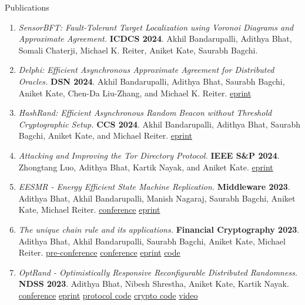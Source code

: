 \documentclass{resume}
\begin{document}
\begin{rSection}{Publications}
\label{sec:org0ffd259}
\vspace{0.5em}
\begin{enumerate}
\item \label{orgc2aa619} \emph{SensorBFT: Fault-Tolerant Target Localization using Voronoi Diagrams and Approximate Agreement.} \textbf{ICDCS 2024}. Akhil Bandarupalli, Adithya Bhat, Somali Chaterji, Michael K. Reiter, Aniket Kate, Saurabh Bagchi.
\item \label{orge4db138} \emph{Delphi: Efficient Asynchronous Approximate Agreement for Distributed Oracles.} \textbf{DSN 2024}. Akhil Bandarupalli, Adithya Bhat, Saurabh Bagchi, Aniket Kate, Chen-Da Liu-Zhang, and Michael K. Reiter. \href{https://arxiv.org/pdf/2405.02431}{eprint}
\item \label{org25ac787} \emph{HashRand: Efficient Asynchronous Random Beacon without Threshold Cryptographic Setup.} \textbf{CCS 2024}. Akhil Bandarupalli, Adithya Bhat, Saurabh Bagchi, Aniket Kate, and Michael Reiter. \href{https://eprint.iacr.org/2023/1755.pdf}{eprint}
\item \label{org9bf3f63} \emph{Attacking and Improving the Tor Directory Protocol.} \textbf{IEEE S\&P 2024}. Zhongtang Luo, Adithya Bhat, Kartik Nayak, and Aniket Kate. \href{https://zhtluo.com/paper/Attacking\_and\_Improving\_the\_Tor\_Directory\_Protocol.pdf}{eprint}
\item \label{org473d87d} \emph{EESMR - Energy Efficient State Machine Replication.} \textbf{Middleware 2023}. Adithya Bhat, Akhil Bandarupalli, Manish Nagaraj, Saurabh Bagchi, Aniket Kate, Michael Reiter. \href{https://dl.acm.org/doi/10.1145/3590140.3592848}{conference} \href{https://arxiv.org/abs/2304.04998}{eprint}
\item \label{org5a1964c}\label{org3c2d425} \emph{The unique chain rule and its applications.} \textbf{Financial Cryptography 2023}. Adithya Bhat, Akhil Bandarupalli, Saurabh Bagchi, Aniket Kate, Michael Reiter. \href{https://fc23.ifca.ai/preproceedings/138.pdf}{pre-conference} \href{https://doi.org/10.1007/978-3-031-47754-6\_3}{conference} \href{https://eprint.iacr.org/2021/180}{eprint} \href{https://github.com/adithyabhatkajake/libchatter-rs}{code}
\item \label{org1ff6573} \emph{OptRand - Optimistically Responsive Reconfigurable Distributed Randomness.} \textbf{NDSS 2023}. Adithya Bhat, Nibesh Shrestha, Aniket Kate, Kartik Nayak. \href{https://www.ndss-symposium.org/ndss-paper/optrand-optimistically-responsive-reconfigurable-distributed-randomness/}{conference} \href{https://eprint.iacr.org/2022/193}{eprint} \href{https://github.com/nibeshrestha/optrand}{protocol code} \href{https://github.com/libdist-rs/optrand-rs}{crypto code} \href{https://www.youtube.com/watch?v=6DH2bGXP3-4}{video}

\end{enumerate}
\end{rSection}
\end{document}
